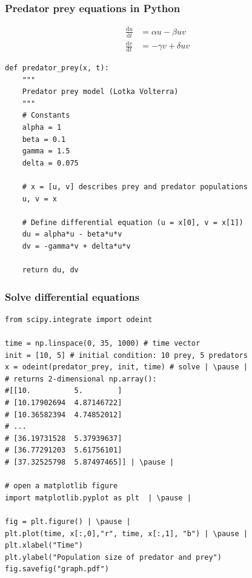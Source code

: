 \documentclass[xcolor=table]{beamer}
\begin{document}
\begin{frame}[fragile]
\frametitle{Predator prey equations in Python}

\vspace{-0.4cm}
\scriptsize
\begin{align*}
\frac{\mathrm{d} u}{\mathrm{d} t} &= \alpha u - \beta uv\\[1em]
\frac{\mathrm{d} v}{\mathrm{d} t} &= -\gamma v + \delta uv 
\end{align*}
\normalsize


\begin{lstlisting}[style=python]
def predator_prey(x, t):
    """
	Predator prey model (Lotka Volterra)
    """
    # Constants
    alpha = 1
    beta = 0.1
    gamma = 1.5
    delta = 0.075
    
    # x = [u, v] describes prey and predator populations
    u, v = x
    
    # Define differential equation (u = x[0], v = x[1])
    du = alpha*u - beta*u*v
    dv = -gamma*v + delta*u*v
    
    return du, dv
\end{lstlisting}

\end{frame}

\begin{frame}[fragile]
\frametitle{Solve differential equations}

\begin{lstlisting}[style=python] 
from scipy.integrate import odeint

time = np.linspace(0, 35, 1000) # time vector
init = [10, 5] # initial condition: 10 prey, 5 predators
x = odeint(predator_prey, init, time) # solve | \pause |
# returns 2-dimensional np.array():
#[[10.          5.        ]
# [10.17902694  4.87146722]
# [10.36582394  4.74852012]
# ...
# [36.19731528  5.37939637]
# [36.77291203  5.61756101]
# [37.32525798  5.87497465]] | \pause |

# open a matplotlib figure
import matplotlib.pyplot as plt  | \pause |

fig = plt.figure() | \pause |
plt.plot(time, x[:,0],"r", time, x[:,1], "b") | \pause |
plt.xlabel("Time")
plt.ylabel("Population size of predator and prey")
fig.savefig("graph.pdf")
\end{lstlisting}
\end{frame}
\end{document}
